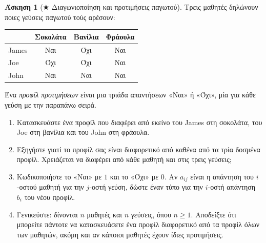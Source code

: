 \documentclass[11pt,a4paper]{article}
\theoremstyle{definition}
\newtheorem{question}{Άσκηση}
\begin{document}
\begin{question}[$\bigstar$ Διαγωνιοποίηση και προτιμήσεις παγωτού]
Τρεις μαθητές δηλώνουν ποιες γεύσεις παγωτού τούς αρέσουν:
\begin{center}
\renewcommand{\arraystretch}{1.3}
\begin{tabular}{lccc}
\hline
 & Σοκολάτα & Βανίλια & Φράουλα \\
\hline
James & Ναι & Όχι & Ναι \\
Joe   & Όχι & Όχι & Ναι \\
John  & Ναι & Ναι & Ναι \\
\hline
\end{tabular}
\end{center}
Ένα \emph{προφίλ προτιμήσεων} είναι μια τριάδα απαντήσεων
«Ναι» ή «Όχι», μία για κάθε γεύση με την παραπάνω σειρά.

\begin{enumerate}
\item Κατασκευάστε ένα προφίλ που διαφέρει από εκείνο
του James στη σοκολάτα, του Joe στη βανίλια
και του John στη φράουλα.

\item Εξηγήστε γιατί το προφίλ σας είναι διαφορετικό
από καθένα από τα τρία δοσμένα προφίλ.
Χρειάζεται να διαφέρει από κάθε μαθητή και στις τρεις γεύσεις;

\item Κωδικοποιήστε το «Ναι» με $1$ και το «Όχι» με $0$.
Αν $a_{ij}$ είναι η απάντηση του $i$-οστού μαθητή
για την $j$-οστή γεύση, δώστε έναν τύπο
για την $i$-οστή απάντηση $b_i$ του νέου προφίλ.

\item Γενικεύστε: δίνονται $n$ μαθητές και $n$ γεύσεις,
όπου $n\ge1$.
Αποδείξτε ότι μπορείτε πάντοτε να κατασκευάσετε
ένα προφίλ διαφορετικό από τα προφίλ όλων των μαθητών,
ακόμη και αν κάποιοι μαθητές έχουν ίδιες προτιμήσεις.

\end{enumerate}
\end{question}
\end{document}
